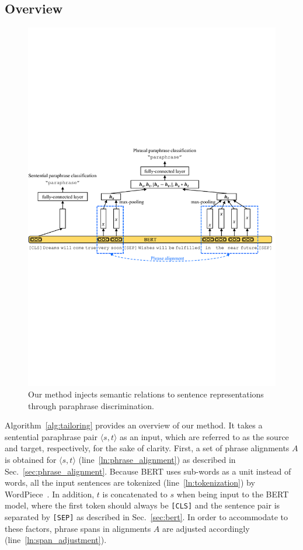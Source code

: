 \documentclass[11pt,a4paper]{article}
\newcommand{\Sref}[1]{Sec.~\ref{#1}}
\newcommand{\Aref}[1]{Algorithm~\ref{#1}}
\newcommand{\Lref}[1]{line~\ref{#1}}
\begin{document}
\subsection{Overview}
\begin{figure}[!t]
\centering
\includegraphics[width=0.98\linewidth]{fig/overview.pdf}
\caption{Our method injects semantic relations to sentence representations through paraphrase discrimination.}
\label{fig:overview}
\end{figure} 

\Aref{alg:tailoring} provides an overview of our method. 
It takes a sentential paraphrase pair $\langle s, t \rangle$ as an input, which are referred to as the source and target, respectively, for the sake of clarity.  
First, a set of phrase alignments $A$ is obtained for $\langle s, t \rangle$ (\Lref{ln:phrase_alignment}) as described in \Sref{sec:phrase_alignment}. 
Because BERT uses sub-words as a unit instead of words, all the input sentences are tokenized (\Lref{ln:tokenization}) by WordPiece~\cite{wordpiece}. 
In addition, $t$ is concatenated to $s$ when being input to the BERT model, where the first token should always be {\tt [CLS]} and the sentence pair is separated by {\tt[SEP]} as described in \Sref{sec:bert}. 
In order to accommodate to these factors, phrase spans in alignments $A$ are adjusted accordingly (\Lref{ln:span_adjustment}).  
\end{document}
